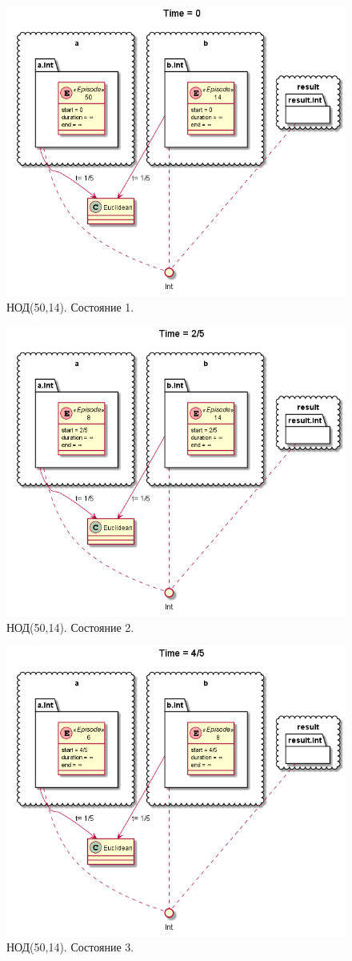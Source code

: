 \begin{figure}[h]
	\centering
	\includegraphics[width=0.7\linewidth]{images/euclidean1}
	\caption{НОД(50,14). Состояние 1.}
	\label{fig:euclidean1}
\end{figure}
\begin{figure}[h]
	\centering
	\includegraphics[width=0.7\linewidth]{images/euclidean2}
	\caption{НОД(50,14). Состояние 2.}
	\label{fig:euclidean2}
\end{figure}
\begin{figure}[h]
	\centering
	\includegraphics[width=0.7\linewidth]{images/euclidean3}
	\caption{НОД(50,14). Состояние 3.}
	\label{fig:euclidean3}
\end{figure}
